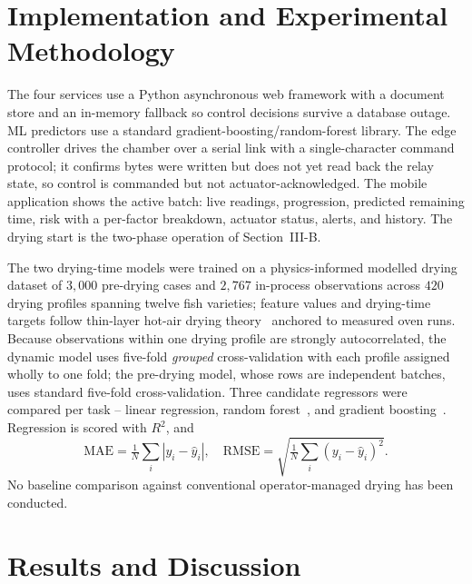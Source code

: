 \documentclass[conference]{IEEEtran}
\begin{document}
\section{Implementation and Experimental Methodology}
The four services use a Python asynchronous web framework with a document
store and an in-memory fallback so control decisions survive a database
outage. ML predictors use a standard gradient-boosting/random-forest
library. The edge controller drives the chamber over a serial link with a
single-character command protocol; it confirms bytes were written but does
not yet read back the relay state, so control is commanded but not
actuator-acknowledged. The mobile application shows the active batch: live
readings, progression, predicted remaining time, risk with a per-factor
breakdown, actuator status, alerts, and history. The drying start is the
two-phase operation of Section~III-B.

The two drying-time models were trained on a physics-informed modelled
drying dataset of $3{,}000$ pre-drying cases and $2{,}767$ in-process
observations across $420$ drying profiles spanning twelve fish varieties;
feature values and drying-time targets follow thin-layer hot-air drying
theory~\cite{b6} anchored to measured oven runs. Because observations
within one drying profile are strongly autocorrelated, the dynamic model
uses five-fold \emph{grouped} cross-validation with each profile assigned
wholly to one fold; the pre-drying model, whose rows are independent
batches, uses standard five-fold cross-validation. Three candidate
regressors were compared per task -- linear regression, random
forest~\cite{b9}, and gradient boosting~\cite{b7}. Regression is scored
with $R^{2}$, and
\begin{equation}
\text{MAE} = \tfrac{1}{N}\!\sum_{i}|y_{i}-\hat{y}_{i}|,\quad
\text{RMSE} = \sqrt{\tfrac{1}{N}\!\sum_{i}(y_{i}-\hat{y}_{i})^{2}}.
\label{eq11}
\end{equation}
No baseline comparison against conventional operator-managed drying has
been conducted.

\section{Results and Discussion}
\end{document}
